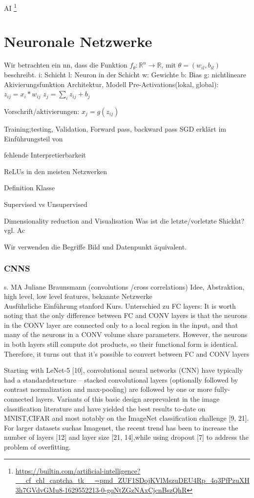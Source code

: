 \documentclass[11pt,a4paper]{article}
\numberwithin{equation}{section}
\begin{document}
	AI \footnote{\url{https://builtin.com/artificial-intelligence?__cf_chl_captcha_tk__=pmd_ZUF1SDojKVlMszuDEU4Rp_4q3PfPzuXH3h7GVdvGMu8-1629552213-0-gqNtZGzNAxCjcnBszQhR}}
	\section{Neuronale Netzwerke} \label{chapter_nn}
	Wir betrachten ein \gls{nn}, dass die Funktion $f_{\theta}:\mathbb{R}^n \to\mathbb{R}$, mit $\theta = (w_{il}, b_{il})$ beschreibt. 
	i: Schicht
	l: Neuron in der Schicht
	w: Gewichte 
	b: Bias
	g: nichtlineare Akivierungsfunktion
	Architektur,
	Modell
	Pre-Activations(lokal, global): $z_{ij} = x_i*w_{ij}$
	$z_j = \sum_iz_{ij} + b_j$
	
	Vorschrift/aktivierungen: $x_j = g(z_{ij})$
	
	
	Training;testing, Validation, Forward pass, backward pass
	SGD erklärt im Einführungsteil von \cite{BatchNormalization}
	
	fehlende Interpretierbarkeit
	
	ReLUs in den meisten Netzwerken
	
	Definition Klasse
	
	Supervised vs Unsupervised
	
	Dimensionality reduction and Visualisation
	Was ist die letzte/vorletzte Shickht? vgl. Ac
	
	Wir verwenden die Begriffe Bild und Datenpunkt äquivalent.
	\subsubsection{CNNS}
	s. MA Juliane Braunsmann (convolutions /cross correlations)
	Idee, Abstraktion, high level, low level features, bekannte Netzwerke\\
	
	Ausführliche Einführung stanford Kurs\cite{cnn_stanford}. Unterschied zu FC layers: 
	It is worth noting that the only difference between FC and CONV layers is that the neurons in the CONV layer are connected only to a local region in the input, and that many of the neurons in a CONV volume share parameters. However, the neurons in both layers still compute dot products, so their functional form is identical. Therefore, it turns out that it’s possible to convert between FC and CONV layers
	
	Starting with LeNet-5   [10], convolutional neural networks (CNN) have typically had a standardstructure – stacked convolutional layers (optionally followed by contrast normalization and max-pooling)  are  followed  by  one  or  more  fully-connected  layers.   Variants  of  this  basic  design  areprevalent in the image classification literature and have yielded the best results to-date on MNIST,CIFAR and most notably on the ImageNet classification challenge [9, 21].  For larger datasets suchas Imagenet, the recent trend has been to increase the number of layers  [12] and layer size [21, 14],while using dropout [7] to address the problem of overfitting.\cite{goingdeeperwithconvolutions}
	
\end{document}
